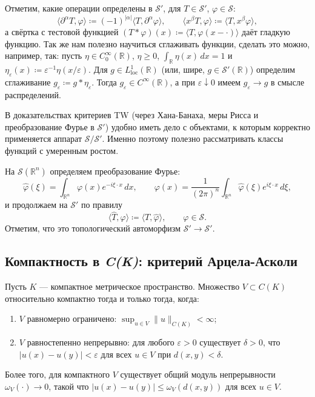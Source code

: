 \documentclass[../NDCNNAI_main.tex]{subfiles}
\begin{document}
Отметим, какие операции определены в \(\mathcal{S}'\), для \(T\in\mathcal{S}'\), \(\varphi\in\mathcal{S}\):
\[
\langle \partial^\alpha T,\varphi\rangle \coloneq (-1)^{|\alpha|}\langle T,\partial^\alpha\varphi\rangle,
\qquad
\langle x^\beta T,\varphi\rangle \coloneq \langle T,x^\beta\varphi\rangle,
\]
а свёртка с тестовой функцией \((T*\varphi)(x)\coloneq\langle T, \varphi(x-\cdot)\rangle\) даёт гладкую функцию.
Так же нам полезно научиться сглаживать функции, сделать это можно, например, так:
пусть \(\eta\in C_0^\infty(\mathbb R)\), \(\eta\ge 0\), \(\int_{\mathbb R}\eta(x)\,dx=1\) и
\(\eta_\varepsilon(x)\coloneq\varepsilon^{-1}\eta(x/\varepsilon)\).
Для \(g\in L^1_{\mathrm{loc}}(\mathbb R)\) (или, шире, \(g\in\mathcal S'(\mathbb R)\)) определим сглаживание
\(g_\varepsilon\coloneq g*\eta_\varepsilon\).
Тогда \(g_\varepsilon\in C^\infty(\mathbb R)\), а при \(\varepsilon\downarrow 0\) имеем \(g_\varepsilon\to g\) в смысле распределений.

\begin{remark}
В доказательствах критериев TW (через Хана-Банаха, меры Рисса и преобразование Фурье в \(\mathcal S'\))
удобно иметь дело с объектами, к которым корректно применяется аппарат \(\mathcal S/\mathcal S'\).
Именно поэтому полезно рассматривать классы функций с умеренным ростом.
\end{remark}

На \(\mathcal{S}(\mathbb{R}^n)\) определяем преобразование Фурье:
\[
\widehat{\varphi}(\xi)=\int_{\mathbb{R}^n}\varphi(x)e^{-i\xi\cdot x}\,dx,
\qquad
\varphi(x)=\frac{1}{(2\pi)^n}\int_{\mathbb{R}^n}\widehat{\varphi}(\xi)e^{i\xi\cdot x}\,d\xi,
\]
и продолжаем на \(\mathcal{S}'\) по правилу
\[
\langle \widehat{T},\varphi\rangle \coloneq \langle T,\widehat{\varphi}\rangle,
\qquad \varphi\in\mathcal{S}.
\]
Отметим, что это топологический автоморфизм \(\mathcal{S}'\to\mathcal{S}'\).

\subsection*{Компактность в \textit{C(K)}: критерий Арцела-Асколи}

\begin{theorem}\label{thm:AA}
Пусть \(K\) --- компактное метрическое пространство.
Множество \(V\subset C(K)\) относительно компактно
тогда и только тогда, когда:
\begin{enumerate}
  \item \(V\) равномерно ограничено: \(\sup_{u\in V}\|u\|_{C(K)}<\infty\);
  \item \(V\) равностепенно непрерывно: для любого \(\varepsilon>0\) существует \(\delta>0\), что
  \(|u(x)-u(y)|<\varepsilon\) для всех \(u\in V\) при \(d(x,y)<\delta\).
\end{enumerate}
Более того, для компактного \(V\) существует общий модуль непрерывности \(\omega_V(\cdot)\to 0\),
такой что \(|u(x)-u(y)|\le \omega_V(d(x,y))\) для всех \(u\in V\).
\end{theorem}
\end{document}
